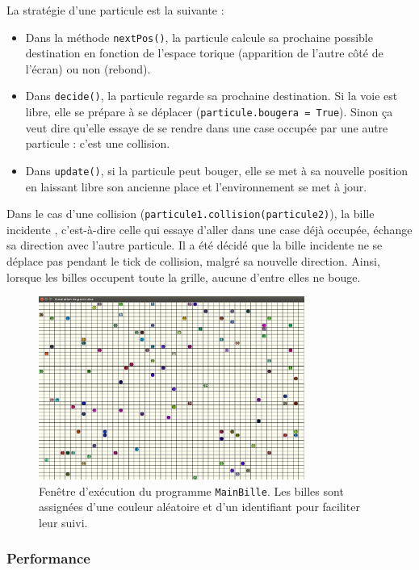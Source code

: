 \documentclass[a4paper]{article}
\begin{document}
\medskip
La stratégie d'une particule est la suivante :
\begin{itemize}
\item Dans la méthode \texttt{nextPos()}, la particule calcule sa prochaine possible destination en fonction de l'espace torique (apparition de \og l'autre côté \fg{} de l'écran) ou non (rebond).
\item Dans \texttt{decide()}, la particule regarde sa prochaine destination. Si la voie est libre, elle se prépare à se déplacer (\texttt{particule.bougera = True}). Sinon ça veut dire qu'elle essaye de se rendre dans une case occupée par une autre particule : c'est une collision.
\item Dans \texttt{update()}, si la particule peut bouger, elle se met à sa nouvelle position en laissant libre son ancienne place et l'environnement se met à jour.
\end{itemize}

\medskip
Dans le cas d'une collision (\texttt{particule1.collision(particule2)}), la bille \og incidente \fg{}, c'est-à-dire celle qui essaye d'aller dans une case déjà occupée, échange sa direction avec l'autre particule. Il a été décidé que la bille incidente ne se déplace pas pendant le tick de collision, malgré sa nouvelle direction. Ainsi, lorsque les billes occupent toute la grille, aucune d'entre elles ne bouge.
 
\begin{figure}[!h]
\centering
\includegraphics[height=6cm]{particules.png}
\caption{Fenêtre d'exécution du programme \texttt{MainBille}. Les billes sont assignées d'une couleur aléatoire et d'un identifiant pour faciliter leur suivi.}
\end{figure}

\subsubsection{Performance}
\end{document}

